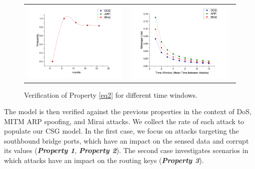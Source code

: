 \noindent
    \begin{figure}[!htb]
       \begin{tabularx}{\linewidth}{ m{8cm}   m{8cm} }
           
 \begin{minipage}[t]{8cm}
     \centering

    \includegraphics[width=180pt, height =110pt]{Graph3.pdf}
    \caption{Verification of Property\ref{eq3}.}
    \label{fig:03}
   \end{minipage}
    
           &
   \begin{minipage}[t]{8cm}
     \centering
   		\includegraphics[width=200pt, height =110pt]{Graph4.pdf}
    \caption{Verification of Property \ref{eq2} for different time windows.}
    \label{fig:04}
   \end{minipage}

       \\ 
    
           \end{tabularx}
\end{figure}

The model is then verified against the previous properties in the context of DoS, MITM ARP spoofing, and Mirai attacks. We collect the rate of each attack to populate our CSG model. In the first case, we focus on attacks targeting the southbound bridge ports, which have an impact on the sensed data and corrupt its values (\emph{\bfseries{Property 1}}, \emph{\bfseries{Property 2}}). The second case investigates scenarios in which attacks have an impact on the routing keys (\emph{\bfseries{Property 3}}).

